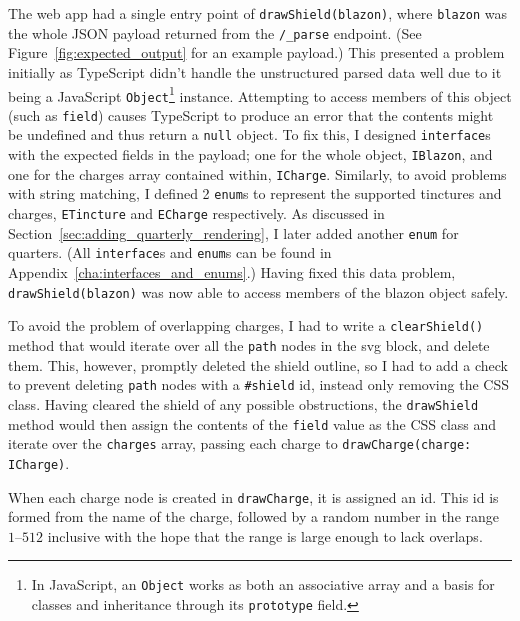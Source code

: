 \documentclass[nobib, a4paper, twoside, justified]{tufte-book}
\makeatletter
\newcommand{\svg}{\gls{svg}\@\xspace}
\newcommand{\charge}{\gls{charge}\@\xspace}
\newcommand{\charges}{\glspl{charge}\@\xspace}
\makeatother
\begin{document}
The web app had a single entry point of \texttt{drawShield(blazon)}, where \texttt{blazon} was the
whole JSON payload returned from the \texttt{/\_parse} endpoint. (See
Figure~\ref{fig:expected_output} for an example payload.) This presented a problem initially as
TypeScript didn't handle the unstructured parsed data well due to it being a JavaScript
\texttt{Object}\footnote{In JavaScript, an \texttt{Object} works as both an associative array and a
basis for classes and inheritance through its \texttt{prototype} field.} instance. Attempting to
access members of this object (such as \texttt{field}) causes TypeScript to produce an error that
the contents might be undefined and thus return a \texttt{null} object. To fix this, I designed
\texttt{interface}s with the expected fields in the payload; one for the whole object,
\texttt{IBlazon}, and one for the \charges{} array contained within, \texttt{ICharge}. Similarly,
to avoid problems with string matching, I defined 2 \texttt{enum}s to represent the supported
tinctures and \charges{}, \texttt{ETincture} and \texttt{ECharge} respectively. As discussed in
Section~\ref{sec:adding_quarterly_rendering}, I later added another \texttt{enum} for quarters.
(All \texttt{interface}s and \texttt{enum}s can be found in
Appendix~\ref{cha:interfaces_and_enums}.) Having fixed this data problem,
\texttt{drawShield(blazon)} was now able to access members of the blazon object safely.

To avoid the problem of overlapping \charges{}, I had to write a \texttt{clearShield()} method that
would iterate over all the \texttt{path} nodes in the \svg{} block, and delete them. This, however,
promptly deleted the shield outline, so I had to add a check to prevent deleting \texttt{path}
nodes with a \texttt{\#shield} id, instead only removing the CSS class. Having cleared the shield
of any possible obstructions, the \texttt{drawShield} method would then assign the contents of the
\texttt{field} value as the CSS class and iterate over the \texttt{\charges{}} array, passing each
\charge{} to \texttt{drawCharge(charge: ICharge)}.

When each \charge{} node is created in \texttt{drawCharge}, it is assigned an id. This id is formed
from the name of the charge, followed by a random number in the range $1\text{--}512$ inclusive
with the hope that the range is large enough to lack overlaps.
\end{document}
